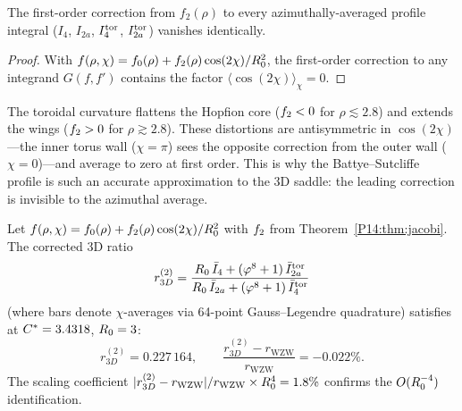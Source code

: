 \begin{lemma}
\label{P14:lem:first_order_vanish}
The first-order correction from $f_2(\rho)$ to every azimuthally-averaged
profile integral ($I_4$, $I_{2a}$, $I_{4}^{\mathrm{tor}}$, $I_{2a}^{\mathrm{tor}}$) vanishes identically.
\begin{proof}
With $f(\rho,\chi)=f_0(\rho)+f_2(\rho)\cos(2\chi)/R_0^2$,
the first-order correction to any integrand $G(f,f')$ contains
the factor $\langle\cos(2\chi)\rangle_\chi = 0$.
\end{proof}
\end{lemma}

\begin{remark}
\label{P14:rem:curvature_flattening}
The toroidal curvature flattens the Hopfion core ($f_2 < 0$ for
$\rho\lesssim 2.8$) and extends the wings ($f_2 > 0$ for
$\rho\gtrsim 2.8$).  These distortions are antisymmetric in
$\cos(2\chi)$---the inner torus wall ($\chi=\pi$) sees the opposite
correction from the outer wall ($\chi=0$)---and average to zero at
first order.  This is why the Battye--Sutcliffe profile is such an
accurate approximation to the 3D saddle: the leading correction is
invisible to the azimuthal average.
\end{remark}

\begin{theorem}
\label{P14:thm:second_order}
Let $f(\rho,\chi)=f_0(\rho)+f_2(\rho)\cos(2\chi)/R_0^2$ with $f_2$
from Theorem~\ref{P14:thm:jacobi}.  The corrected 3D ratio
\begin{equation}
  r_{3D}^{(2)}
  = \frac{R_0\,\bar{I}_4 + (\varphi^8+1)\,\bar{I}_{2a}^{\mathrm{tor}}}
         {R_0\,\bar{I}_{2a} + (\varphi^8+1)\,\bar{I}_4^{\mathrm{tor}}}
  \label{P14:eq:r3D_second}
\end{equation}
(where bars denote $\chi$-averages via 64-point Gauss--Legendre quadrature)
satisfies at $C^*=3.4318$, $R_0=3$:
\begin{equation}
  \boxed{r_{3D}^{(2)} = 0.227\,164,\qquad
  \frac{r_{3D}^{(2)} - r_{\mathrm{WZW}}}{r_{\mathrm{WZW}}} = -0.022\%.}
  \label{P14:eq:r3D_second_val}
\end{equation}
The scaling coefficient $|r_{3D}^{(2)}-r_\mathrm{WZW}|/r_\mathrm{WZW}\times R_0^4=1.8\%$
confirms the $O(R_0^{-4})$ identification.
\end{theorem}

